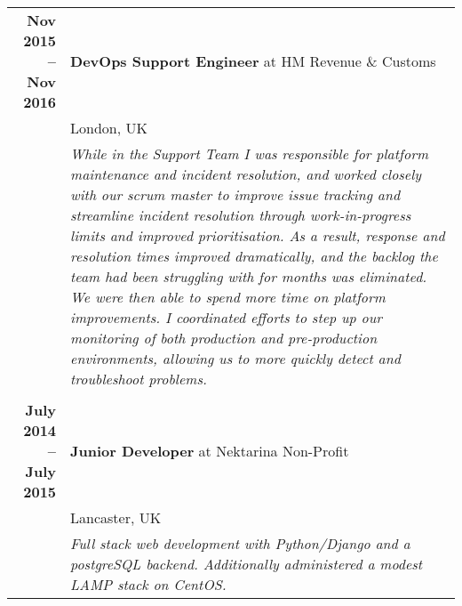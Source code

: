 \documentclass[a4paper,10pt]{article} %
\begin{document}
\begin{tabularx}{\textwidth}{r|X}
\textbf{Nov 2015 -- Nov 2016}       & \textbf{DevOps Support Engineer} at HM Revenue \& Customs \\
                                   & London, UK \\
                                   & \footnotesize\emph{While in the Support
                                   Team I was responsible for platform
                                   maintenance and incident resolution, and
                                   worked closely with our scrum master to
                                   improve issue tracking and streamline
                                   incident resolution through work-in-progress
                                   limits and improved prioritisation. As a
                                   result, response and resolution times
                                   improved dramatically, and the backlog the
                                   team had been struggling with for months was
                                   eliminated. We were then able to spend more
                                   time on platform improvements. I coordinated
                                   efforts to step up our monitoring of both
                                   production and pre-production environments,
                                   allowing us to more quickly detect and
                                   troubleshoot problems.}\\

\multicolumn{2}{r}{} \\ %

\textbf{July 2014 -- July 2015}    & \textbf{Junior Developer} at {Nektarina Non-Profit}\\
                                   & Lancaster, UK\\
                                   & \footnotesize\emph{Full stack web development with Python/Django and a postgreSQL backend. Additionally administered a modest LAMP stack on CentOS.}\\

\end{tabularx}

\end{document}
